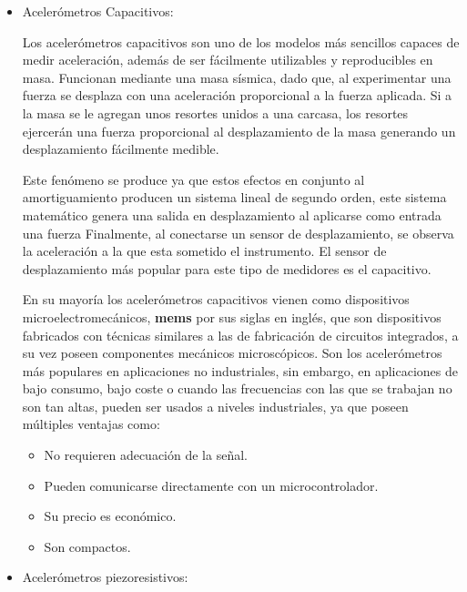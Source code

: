 \begin{itemize}
    \item  Acelerómetros Capacitivos:

        Los acelerómetros capacitivos son uno de los modelos más sencillos
        capaces de medir
        aceleración, además de ser fácilmente utilizables y reproducibles en masa.
        Funcionan mediante una masa sísmica, dado que, al  experimentar una fuerza
        se desplaza con una aceleración proporcional a la fuerza aplicada.
        Si a la masa se le agregan unos resortes unidos a una carcasa, los resortes
        ejercerán una fuerza proporcional al desplazamiento de la masa generando un
        desplazamiento fácilmente medible.

        Este fenómeno se produce ya que estos efectos en conjunto al
        amortiguamiento producen un sistema lineal de
        segundo orden, este sistema matemático genera una salida en desplazamiento
        al aplicarse como entrada una fuerza
         Finalmente, al conectarse un sensor de desplazamiento, se observa
        la aceleración a la que esta sometido el instrumento.
        El sensor de desplazamiento más
        popular para este tipo de medidores es el capacitivo.

        En su mayoría los acelerómetros capacitivos vienen como dispositivos
        microelectromecánicos, \textbf{mems} por sus siglas en inglés, que son
        dispositivos
        fabricados con técnicas similares a las de fabricación de circuitos
        integrados, a su vez poseen componentes mecánicos microscópicos. Son los
        acelerómetros más populares en aplicaciones no industriales, sin embargo,
        en aplicaciones de bajo consumo, bajo coste o cuando las frecuencias con
        las que se trabajan no son tan altas, pueden ser usados a niveles
        industriales, ya que poseen múltiples ventajas como:

        \begin{itemize}[noitemsep]
            \item No requieren adecuación de la señal.
            \item Pueden comunicarse directamente con un microcontrolador.
            \item Su precio es económico.
            \item Son compactos.
        \end{itemize}


    \item  Acelerómetros piezoresistivos:


\end{itemize}
